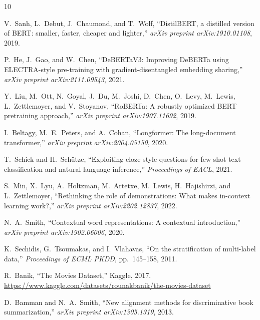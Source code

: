\documentclass[11pt,a4paper]{article}
\begin{document}
\begin{thebibliography}{10}

V.~Sanh, L.~Debut, J.~Chaumond, and T.~Wolf,
``DistilBERT, a distilled version of BERT: smaller, faster, cheaper and lighter,''
\textit{arXiv preprint arXiv:1910.01108}, 2019.

P.~He, J.~Gao, and W.~Chen,
``DeBERTaV3: Improving DeBERTa using ELECTRA-style pre-training with gradient-disentangled embedding sharing,''
\textit{arXiv preprint arXiv:2111.09543}, 2021.

Y.~Liu, M.~Ott, N.~Goyal, J.~Du, M.~Joshi, D.~Chen, O.~Levy, M.~Lewis, L.~Zettlemoyer, and V.~Stoyanov,
``RoBERTa: A robustly optimized BERT pretraining approach,''
\textit{arXiv preprint arXiv:1907.11692}, 2019.

I.~Beltagy, M.~E.~Peters, and A.~Cohan,
``Longformer: The long-document transformer,''
\textit{arXiv preprint arXiv:2004.05150}, 2020.

T.~Schick and H.~Sch{\"u}tze,
``Exploiting cloze-style questions for few-shot text classification and natural language inference,''
\textit{Proceedings of EACL}, 2021.

S.~Min, X.~Lyu, A.~Holtzman, M.~Artetxe, M.~Lewis, H.~Hajishirzi, and L.~Zettlemoyer,
``Rethinking the role of demonstrations: What makes in-context learning work?,''
\textit{arXiv preprint arXiv:2202.12837}, 2022.

N.~A.~Smith,
``Contextual word representations: A contextual introduction,''
\textit{arXiv preprint arXiv:1902.06006}, 2020.

K.~Sechidis, G.~Tsoumakas, and I.~Vlahavas,
``On the stratification of multi-label data,''
\textit{Proceedings of ECML PKDD}, pp.~145--158, 2011.

R.~Banik,
``The Movies Dataset,''
Kaggle, 2017.
\url{https://www.kaggle.com/datasets/rounakbanik/the-movies-dataset}

D.~Bamman and N.~A.~Smith,
``New alignment methods for discriminative book summarization,''
\textit{arXiv preprint arXiv:1305.1319}, 2013.

\end{thebibliography}
\end{document}

